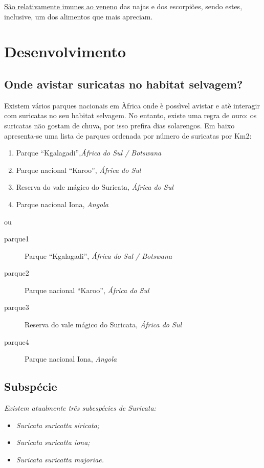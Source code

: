 \documentclass[a4paper,11pt]{report}
\begin{document}
	\uline{São relativamente imunes ao veneno} das najas
	e dos escorpiões, sendo estes, inclusive, um dos alimentos que mais
	apreciam.

\chapter{Desenvolvimento}

\section{Onde avistar suricatas no habitat selvagem?}
	Existem vários parques nacionais em Àfrica onde è possìvel avistar e
	atè interagir com suricatas no seu habitat selvagem. No entanto, existe
	uma regra de ouro: os suricatas não gostam de chuva, por isso prefira
	dias solarengos.
	Em baixo apresenta-se uma lista de parques ordenada por número de
	suricatas por Km2:

	\begin{enumerate}
		\item Parque “Kgalagadi”,\textit{África do Sul / Botswana}
		\item Parque nacional “Karoo”, \textit{África do Sul}
		\item Reserva do vale mágico do Suricata, \textit{África do Sul}
		\item Parque nacional Iona, \textit{Angola}
	\end{enumerate}

ou

	\begin{description}
		\item[parque1] Parque “Kgalagadi”, \textit{África do Sul / Botswana}
		\item[parque2] Parque nacional “Karoo”, \textit{África do Sul}
		\item[parque3] Reserva do vale mágico do Suricata, \textit{África do Sul}
		\item[parque4] Parque nacional Iona, \textit{Angola}
	\end{description}


\section{Subspécie}
	\textit{Existem atualmente três subespécies de Suricata:}


	\begin{itemize}
		\item \textit{Suricata suricatta siricata;}
		\item \textit{Suricata suricatta iona;}
		\item \textit{Suricata suricatta majoriae.}
	\end{itemize}
\end{document}
